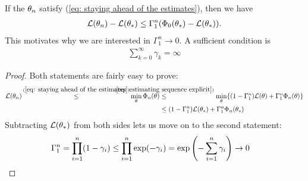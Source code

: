 \begin{lemma}
	\label{lem: estimating sequence convergence speed}
	If the \(\theta_n\) satisfy (\ref{eq: staying ahead of the estimates}),
	then we have
	\begin{align*}
		\mathcal{L}(\theta_n) - \mathcal{L}(\theta_*)
		\le \Gamma_1^n (\Phi_0(\theta_*)-\mathcal{L}(\theta_*)).
	\end{align*}
	This motivates why we are interested in \(\Gamma_1^n\to 0\). A sufficient
	condition is
	\begin{align*}
		\sum_{k=0}^\infty \gamma_k = \infty
	\end{align*}
\end{lemma}
\begin{proof}
	Both statements are fairly easy to prove:
	\begin{align*}
		\Loss(\weights_n)
		\xle{(\ref{eq: staying ahead of the estimates})}
		\min_{\weights}\Phi_n(\weights)
		&\lxle{(\ref{eq: estimating sequence explicit})} \min_{\weights} \{
		(1-\Gamma_1^n) \Loss(\weights) + \Gamma_1^n\Phi_n(\weights) \}\\ 
		&\le (1-\Gamma_1^n) \Loss(\weights_*) + \Gamma_1^n\Phi_n(\weights_*)
	\end{align*}
	Subtracting \(\mathcal{L}(\theta_*)\) from both sides lets us move on to the
	second statement:
	\begin{align*}
		\Gamma_1^n &= \prod_{i=1}^n (1-\gamma_i)
		\le\prod_{i=1}^n \exp(-\gamma_i)
		= \exp\left(-\sum_{i=1}^n\gamma_i\right) \to 0
		\qedhere
	\end{align*}
\end{proof}


